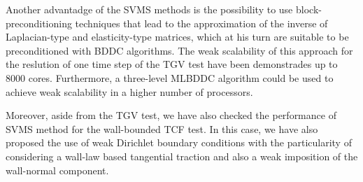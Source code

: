 Another advantadge of the SVMS methods is the possibility to use block-preconditioning techniques that lead to the approximation of the inverse of Laplacian-type and elasticity-type matrices, which at his turn are suitable to be preconditioned with BDDC algorithms. The weak scalability of this approach for the reslution of one time step of the TGV test have been demonstrades up to 8000 cores. Furthermore, a three-level MLBDDC algorithm could be used to achieve weak scalability in a higher number of processors.

Moreover, aside from the TGV test, we have also checked the performance of SVMS method for the wall-bounded TCF test. In this case, we have also proposed the use of weak Dirichlet boundary conditions with the particularity of considering a wall-law based tangential traction and also a weak imposition of the wall-normal component.